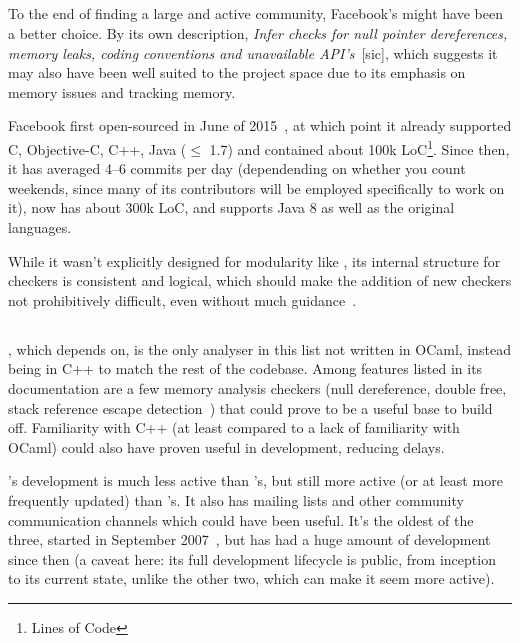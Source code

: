 \subsection{}

To the end of finding a large and active community, Facebook's  might have been a better choice. By its own description, \textit{Infer checks for null pointer dereferences, memory leaks, coding conventions and unavailable API’s}~[sic], which suggests it may also have been well suited to the project space due to its emphasis on memory issues and tracking memory.

Facebook first open-sourced  in June of 2015~\cite{infergit}, at which point it already supported C, Objective-C, C++, Java ($\le$ 1.7) and contained about 100k LoC\footnote{Lines of Code}. Since then, it has averaged 4–6 commits per day (dependending on whether you count weekends, since many of its contributors will be employed specifically to work on it), now has about 300k LoC, and supports Java 8 as well as the original languages.

While it wasn't explicitly designed for modularity like , its internal structure for checkers is consistent and logical, which should make the addition of new checkers not prohibitively difficult, even without much guidance~\cite{infercheckers}.

\subsection{}

, which  depends on, is the only analyser in this list not written in OCaml, instead being in C++ to match the rest of the  codebase. Among features listed in its documentation are a few memory analysis checkers (null dereference, double free, stack reference escape detection~\cite{clangchecks}) that could prove to be a useful base to build off. Familiarity with C++ (at least compared to a lack of familiarity with OCaml) could also have proven useful in development, reducing delays.

's development is much less active than 's, but still more active (or at least more frequently updated) than 's. It also has mailing lists and other community communication channels which could have been useful. It's the oldest of the three, started in September 2007~\cite{clangrelease}, but has had a huge amount of development since then (a caveat here: its full development lifecycle is public, from inception to its current state, unlike the other two, which can make it seem more active).

